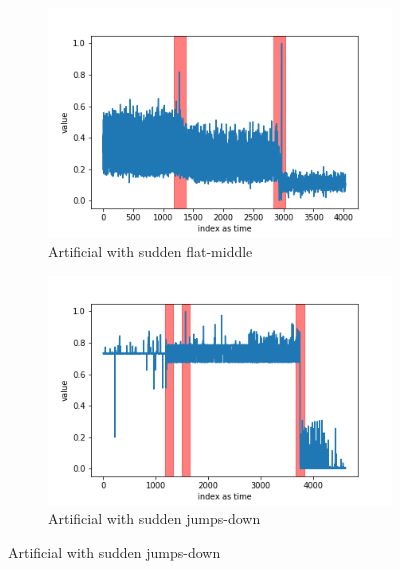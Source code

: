 \documentclass[12pt]{article}
\begin{document}
\begin{figure}[H]
  \begin{subfigure}[t]{.5\textwidth}
    \centering
    \includegraphics[width=\linewidth]{images/dataAnomalies/aws/ec2_cpu_utilization_5f5533.png}
    \caption{Artificial with sudden flat-middle}
  \end{subfigure}
  \hfill
  \begin{subfigure}[t]{.5\textwidth}
    \centering
    \includegraphics[width=\linewidth]{images/dataAnomalies/aws/grok_asg_anomaly.png}
    \caption{Artificial with sudden jumps-down}
  \end{subfigure}

  \medskip


\end{figure}
\end{document}
